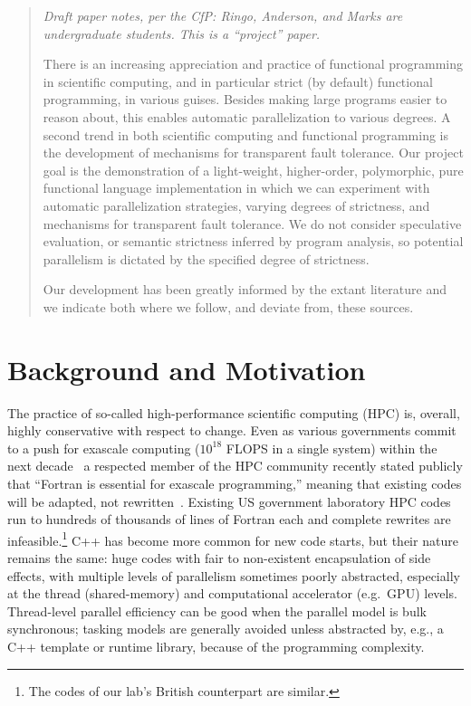 \documentclass{llncs}
\begin{document}
\begin{abstract}
{\color{OliveGreen} %
\emph{Draft paper notes, per the CfP:  Ringo, Anderson, and Marks are undergraduate
students.  This is a ``project'' paper.}
}

There is an increasing appreciation and practice of functional programming in
scientific computing, and in particular strict (by default) functional
programming, in various guises.  Besides making large programs easier to
reason about, this enables automatic parallelization to various degrees.  A
second trend in both scientific computing and functional programming is the
development of mechanisms for transparent fault tolerance.  Our project goal
is the demonstration of a light-weight, higher-order, polymorphic, pure
functional language implementation in which we can experiment with automatic
parallelization strategies, varying degrees of strictness, and mechanisms for
transparent fault tolerance.
%
We do not consider speculative evaluation, or semantic strictness inferred by
program analysis, so potential parallelism is dictated by the specified degree of
strictness.

\hspace{0.2in} Our development has been greatly informed by the extant
literature and we indicate both where we follow, and deviate from,
these sources.


\end{abstract}

\section{Background and Motivation}
The practice of so-called high-performance scientific computing (HPC) is,
overall, highly conservative with respect to change.  Even as 
various governments commit to a push for exascale computing ($10^{18}$ FLOPS in
a single system) within the next
decade~\cite{Exascale-roadmap,EUexascale,Exascale-org} a respected
member of the HPC community recently stated publicly that ``Fortran is
essential for exascale programming,'' meaning that existing codes
will be adapted, not rewritten~\cite{Heroux16}.  Existing US government
laboratory HPC codes run to hundreds of thousands of lines of Fortran each and
complete rewrites are infeasible.\footnote{The codes of our lab's British
  counterpart are similar.}  C++ has become more common for new code starts,
but their nature remains the same: huge codes with fair to non-existent
encapsulation of side effects, with multiple levels of parallelism sometimes
poorly abstracted, especially at the thread (shared-memory) and computational
accelerator (e.g.\ GPU) levels.  Thread-level parallel efficiency can be good
when the parallel model is bulk synchronous; tasking models are generally
avoided unless abstracted by, e.g., a C++ template or runtime library, because
of the programming complexity.
\end{document}
